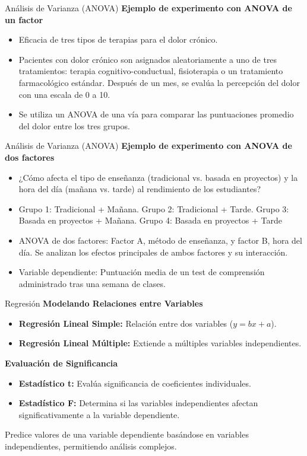 ﻿\documentclass{beamer}
\begin{document}
\begin{frame}{Análisis de Varianza (ANOVA)}
    \textbf{Ejemplo de experimento con ANOVA de un factor}
    \begin{itemize}
        \item Eficacia de tres tipos de terapias para el dolor crónico.
        \item Pacientes con dolor crónico son asignados aleatoriamente a uno de tres tratamientos: terapia cognitivo-conductual, fisioterapia o un tratamiento farmacológico estándar. Después de un mes, se evalúa la percepción del dolor con una escala de 0 a 10.
        \item Se utiliza un ANOVA de una vía para comparar las puntuaciones promedio del dolor entre los tres grupos.
    \end{itemize}
\end{frame}

\begin{frame}{Análisis de Varianza (ANOVA)}
    \textbf{Ejemplo de experimento con ANOVA de dos factores}
    \begin{itemize}
        \item ¿Cómo afecta el tipo de enseñanza (tradicional vs. basada en proyectos) y la hora del día (mañana vs. tarde) al rendimiento de los estudiantes?
        \item Grupo 1: Tradicional + Mañana. Grupo 2: Tradicional + Tarde. Grupo 3: Basada en proyectos + Mañana. Grupo 4: Basada en proyectos + Tarde  
        \item ANOVA de dos factores: Factor A, método de enseñanza, y factor B, hora del día. Se analizan los efectos principales de ambos factores y su interacción.   
        \item Variable dependiente: Puntuación media de un test de comprensión administrado tras una semana de clases.
    \end{itemize}
\end{frame}

\begin{frame}{Regresión}
    \textbf{Modelando Relaciones entre Variables}
    \begin{itemize}
        \item \textbf{Regresión Lineal Simple:} Relación entre dos variables ($y = bx + a$).
        \item \textbf{Regresión Lineal Múltiple:} Extiende a múltiples variables independientes.
    \end{itemize}

    \textbf{Evaluación de Significancia}
    \begin{itemize}
        \item \textbf{Estadístico t:} Evalúa significancia de coeficientes individuales.
        \item \textbf{Estadístico F:} Determina si las variables independientes afectan significativamente a la variable dependiente.
    \end{itemize}

    Predice valores de una variable dependiente basándose en variables independientes, permitiendo análisis complejos.
\end{frame}
\end{document}
